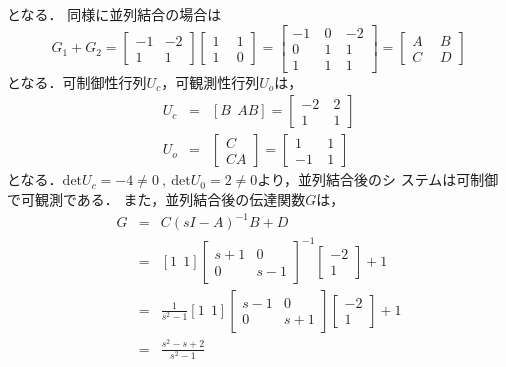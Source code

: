 \documentclass[a4paper,12pt]{jarticle}
\begin{document}
%
となる．
%
同様に並列結合の場合は
%
\begin{equation}
 G_1+G_2=\left[
  \begin{array}{c|c}
  -1 & -2  \\ \hline
   1 & 1    
  \end{array}
  \right] \left[
  \begin{array}{c|c}
  1 ~&~ 1  \\ \hline
  1 ~&~ 0    
  \end{array}
  \right]=\left[
  \begin{array}{cc|c}
  -1 &~  0 ~& -2  \\ 
  0  &~  1 ~& 1  \\\hline
  1  &~  1 ~& 1
  \end{array}
  \right]=\left[
  \begin{array}{c|c}
  A ~&~ B  \\ \hline
  C ~&~ D    
  \end{array}
  \right]
  \end{equation}
%
となる．可制御性行列$U_c$，可観測性行列$U_o$は，
%
\begin{eqnarray}
 U_c&=&[B~~AB]=\left[
  \begin{array}{cc}
  -2 &~ 2  \\ 
  1  &~ 1    
  \end{array}
\right] \\
 U_o&=&\left[
  \begin{array}{c}
  C \\ 
  CA     
  \end{array}
\right]=\left[
  \begin{array}{cc}
  1  &~ 1  \\ 
  -1 &~ 1    
  \end{array}
\right] 
\end{eqnarray}
%
となる．$\mathrm{det}U_c=-4\neq0~,~\mathrm{det}U_0=2\neq0$より，並列結合後のシ
ステムは可制御で可観測である．
%
また，並列結合後の伝達関数$G$は，
%
\begin{eqnarray}
 G&=&C(sI-A)^{-1}B+D \nonumber\\
 &=&[1~~1]\left[
  \begin{array}{cc}
  s+1 &  0  \\ 
   0  & s-1    
  \end{array}
\right]^{-1}\left[
  \begin{array}{c}
   -2  \\ 
   1      
  \end{array}
\right]+1 \nonumber\\
  &=&\frac{1}{s^2-1}[1~~1]\left[
  \begin{array}{cc}
  s-1 &  0  \\ 
   0  & s+1    
  \end{array}
\right]\left[
  \begin{array}{c}
   -2  \\ 
   1      
  \end{array}
\right]+1 \nonumber\\
&=&\frac{s^2-s+2}{s^2-1}
\end{eqnarray}
\end{document}
